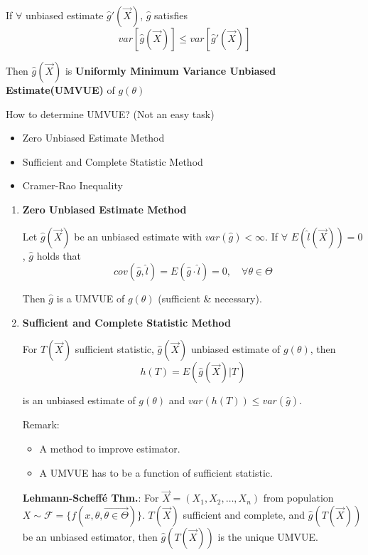         If $\forall$ unbiased estimate $\hat{g}\prime(\vec{X})$, $\hat{g}$ satisfies
        \[
            var[\hat{g}(\vec{X})]\leq var[\hat{g}\prime(\vec{X})]    
        \]

        Then $\hat{g}(\vec{X})$ is \textbf{Uniformly Minimum Variance Unbiased Estimate(UMVUE)} of $g(\theta)$

        How to determine UMVUE? (Not an easy task)
        \begin{itemize}
            \item Zero Unbiased Estimate Method
            \item Sufficient and Complete Statistic Method
            \item Cramer-Rao Inequality
        \end{itemize}

\begin{enumerate}
\item \textbf{Zero Unbiased Estimate Method}
            
    Let $\hat{g}(\vec{X})$ be an unbiased estimate with $var(\hat{g})<\infty$. If $\forall$ $E(\hat{l}(\vec{X}))=0$ , $\hat{g}$ holds that
    \[
        cov(\hat{g},\hat{l})=E(\hat{g}\cdot\hat{l})=0,\quad\forall\theta\in\Theta    
    \]

    Then $\hat{g}$ is a UMVUE of $g(\theta)$ (sufficient \& necessary).





\item \textbf{Sufficient and Complete Statistic Method}

    For $T(\vec{X})$ sufficient statistic, $\hat{g}(\vec{X})$ unbiased estimate of $g(\theta)$, then 
\[
    h(T)=E(\hat{g}(\vec{X})| T)    
\]

    is an unbiased estimate of $g(\theta)$ and $var(h(T))\leq var(\hat{g})$.

    Remark:
    \begin{itemize}
        \item A method to improve estimator.
        \item A UMVUE has to be a function of sufficient statistic.
    \end{itemize}

    \textbf{Lehmann-Scheffé Thm.}: For $\vec{X}=(X_1,X_2,\ldots,X_n)$ from population $X\sim\mathscr{F}=\{f(x,\theta,\vec{\theta\in\Theta})\}$. $T(\vec{X})$ sufficient and complete, and $\hat{g}(T(\vec{X}))$ be an unbiased estimator, then $\hat{g}(T(\vec{X}))$ is the unique UMVUE.


\end{enumerate}
